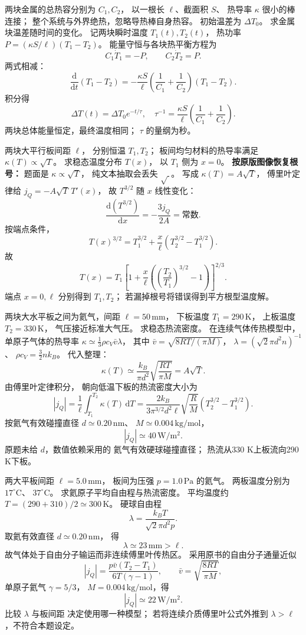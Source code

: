 两块金属的总热容分别为 $C_1,C_2$，
以一根长 $\ell$、截面积 $S$、
热导率 $\kappa$ 很小的棒连接；
整个系统与外界绝热，忽略导热棒自身热容。
初始温差为 $\Delta T_0$。
求金属块温差随时间的变化。
\exsolution
记两块瞬时温度 $T_1(t),T_2(t)$，
热功率 $P=(\kappa S/\ell)(T_1-T_2)$。
能量守恒与各块热平衡方程为
\[
C_1\dot T_1=-P,\qquad C_2\dot T_2=P.
\]
两式相减：
\[
\frac{\mathrm d}{\mathrm dt}(T_1-T_2)
=-\frac{\kappa S}{\ell}
\left(\frac1{C_1}+\frac1{C_2}\right)(T_1-T_2).
\]
积分得
\[
\boxed{\Delta T(t)=\Delta T_0e^{-t/\tau}},\quad
\boxed{\tau^{-1}=\frac{\kappa S}{\ell}
\left(\frac1{C_1}+\frac1{C_2}\right)}.
\]
\excheck 两块总体能量恒定，最终温度相同；
$\tau$ 的量纲为秒。

两块大平行板间距 $\ell$，
分别恒温 $T_1,T_2$；
板间均匀材料的热导率满足
$\kappa(T)\propto\sqrt{T}$。
求稳态温度分布 $T(x)$，
以 $T_1$ 侧为 $x=0$。
\exsolution
\textbf{按原版图像恢复根号：}
题面是 $\kappa\propto\sqrt{T}$，
纯文本抽取会丢失 $\sqrt{\ }$。
写成 $\kappa(T)=A\sqrt T$，
傅里叶定律给
$j_Q=-A\sqrt T\,T'(x)$，
故 $T^{3/2}$ 随 $x$ 线性变化：
\[
\frac{\mathrm d(T^{3/2})}{\mathrm dx}
=-\frac{3j_Q}{2A}=\text{常数}.
\]
按端点条件，
\[
T(x)^{3/2}
=T_1^{3/2}+\frac{x}{\ell}
(T_2^{3/2}-T_1^{3/2}).
\]
故
\[
\boxed{T(x)=T_1
\left[1+\frac{x}{\ell}
\left(\left(\frac{T_2}{T_1}\right)^{3/2}-1\right)
\right]^{2/3}}.
\]
\excheck 端点 $x=0,\ell$ 分别得到 $T_1,T_2$；
若漏掉根号将错误得到平方根型温度解。

两块大水平板之间为氦气，间距
$\ell=50\,\mathrm{mm}$，
下板温度 $T_1=290\,\mathrm K$，
上板温度 $T_2=330\,\mathrm K$，
气压接近标准大气压。
求稳态热流密度。
\exsolution
在连续气体传热模型中，
单原子气体的热导率
$\kappa\simeq\frac13\rho c_V\bar v\lambda$，
其中 $\bar v=\sqrt{8RT/(\pi M)}$，
$\lambda=(\sqrt2\pi d^2n)^{-1}$、
$\rho c_V=\frac32nk_B$。
代入整理：
\[
\kappa(T)\simeq
\frac{k_B}{\pi d^2}\sqrt{\frac{RT}{\pi M}}
=A\sqrt T.
\]
由傅里叶定律积分，
朝向低温下板的热流密度大小为
\[
|j_Q|=\frac1\ell\int_{T_1}^{T_2}\kappa(T)\,\mathrm dT
=\boxed{\frac{2k_B}{3\pi^{3/2}d^2\ell}
\sqrt{\frac RM}(T_2^{3/2}-T_1^{3/2})}.
\]
按氦气有效碰撞直径
$d\simeq0.20\,\mathrm{nm}$、
$M\simeq0.004\,\mathrm{kg/mol}$，
\[
\boxed{|j_Q|\simeq40\,\mathrm{W/m^2}}.
\]
\excheck 原题未给 $d$，数值依赖采用的
氦气有效硬球碰撞直径；
热流从330 K上板流向290 K下板。

两大平板间距 $\ell=5.0\,\mathrm{mm}$，
板间为压强 $p=1.0\,\mathrm{Pa}$ 的氦气。
两板温度分别为 $17^\circ\mathrm C$、
$37^\circ\mathrm C$。
求氦原子平均自由程与热流密度。
\exsolution
平均温度约
$T=(290+310)/2\simeq300\,\mathrm K$。
硬球自由程
\[
\lambda=\frac{k_BT}{\sqrt2\pi d^2p}.
\]
取氦有效直径 $d\simeq0.20\,\mathrm{nm}$，
得
\[
\boxed{\lambda\simeq23\,\mathrm{mm}>\ell}.
\]
故气体处于自由分子输运而非连续傅里叶传热区。
采用原书的自由分子通量近似
\[
|j_Q|=\frac{p\bar v(T_2-T_1)}
{6T(\gamma-1)},\qquad
\bar v=\sqrt{\frac{8RT}{\pi M}},
\]
单原子氦气 $\gamma=5/3$，
$M=0.004\,\mathrm{kg/mol}$，得
\[
\boxed{|j_Q|\simeq22\,\mathrm{W/m^2}}.
\]
\excheck 比较 $\lambda$ 与板间距
决定使用哪一种模型；
若将连续介质傅里叶公式外推到
$\lambda>\ell$，不符合本题设定。

